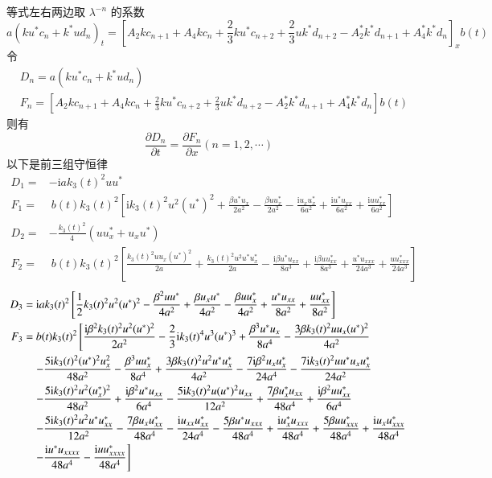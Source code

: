 等式左右两边取 $\lambda^{-n}$ 的系数
\begin{equation}
  a(ku^{*}c_{n} + k^{*}ud_{n})_{t} = \left[A_{2}kc_{n+1} + A_{4}kc_{n} + \frac{2}{3}ku^{*}c_{n+2} + \frac{2}{3}uk^{*}d_{n+2} - A_{2}^{*}k^{*}d_{n+1} + A_{4}^{*}k^{*}d_{n}\right]_{x}b(t)
\end{equation}
令
\begin{align}
  & D_{n} = a(ku^{*}c_{n} + k^{*}ud_{n}) \\
  & F_{n} = \left[A_{2}kc_{n+1} + A_{4}kc_{n} + \frac{2}{3}ku^{*}c_{n+2} + \frac{2}{3}uk^{*}d_{n+2} - A_{2}^{*}k^{*}d_{n+1} + A_{4}^{*}k^{*}d_{n}\right]b(t)
\end{align}
则有
\begin{equation}
  \frac{\partial D_{n}}{\partial t} = \frac{\partial F_{n}}{\partial x} (n = 1, 2, \cdots)
\end{equation}
以下是前三组守恒律
\begin{align}
  D_{1} =& -\mathrm{i}ak_3(t)^{2} uu^{*} \\
  F_{1} =&\ b(t)k_3(t)^{2} \left[\mathrm{i}k_3(t)^{2}u^2(u^*)^2 + \frac{\beta u^{*}u_{x}}{2a^{2}} - \frac{\beta uu^{*}_{x}}{2a^{2}} - \frac{\mathrm{i}u_{x}u^{*}_{x}}{6a^{2}} + \frac{\mathrm{i}u^{*}u_{xx}}{6a^{2}} + \frac{\mathrm{i}uu^{*}_{xx}}{6a^{2}} \right] \\
  D_{2} =& -\frac{k_{3}(t)^{2}}{4}(uu^{*}_{x} + u_{x}u^{*}) \\
  F_{2} =&\ b(t)k_3(t)^{2} \left[\frac{k_3(t)^{2}uu_x(u^*)^2}{2a} + \frac{k_3(t)^2u^2u^*u^*_x}{2a} -\frac{\mathrm{i}\beta u^*u_{xx}}{8a^3} + \frac{\mathrm{i}\beta uu^*_{xx}}{8a^3} + \frac{u^*u_{xxx}}{24a^3} + \frac{uu^*_{xxx}}{24a^3}  \right]
\end{align}
\begin{align}
  D_{3} =&\ \mathrm{i}ak_3(t)^2\left[\frac{1}{2}k_3(t)^2u^2(u^*)^2 - \frac{\beta^2 uu^*}{4a^2} + \frac{\beta u_xu^*}{4a^2} - \frac{\beta uu^*_x}{4a^2} + \frac{u^*u_{xx}}{8a^2} + \frac{uu^*_{xx}}{8a^2}\right] \\
  F_{3} =&\ b(t)k_3(t)^{2} \left[ \frac{\mathrm{i}\beta^2k_3(t)^2u^2(u^*)^2}{2a^2} - \frac{2}{3}\mathrm{i}k_3(t)^4u^3(u^*)^3 + \frac{\beta^3 u^*u_x}{8a^4} - \frac{3\beta k_3(t)^2uu_x(u^*)^2}{4a^2} \right. \notag \\
  & \left.- \frac{5\mathrm{i}k_3(t)^2(u^*)^2u_x^2}{48a^2} - \frac{\beta^3uu^*_x}{8a^4} + \frac{3\beta k_3(t)^2u^2u^*u^*_x}{4a^2} - \frac{7\mathrm{i}\beta^2u_xu^*_x}{24a^4} - \frac{7\mathrm{i}k_3(t)^2uu^*u_xu^*_x}{24a^2} \right. \notag\\
  & \left. -\frac{5\mathrm{i}k_3(t)^2u^2(u^*_x)^2}{48a^2} + \frac{\mathrm{i}\beta^2u^*u_{xx}}{6a^4} - \frac{5\mathrm{i}k_3(t)^2u(u^*)^2u_{xx}}{12a^2} + \frac{7\beta u^*_xu_{xx}}{48a^4} + \frac{\mathrm{i}\beta^2uu^*_{xx}}{6a^4} \right. \notag\\
  & \left.  - \frac{5\mathrm{i}k_3(t)^2u^2u^*u^*_{xx}}{12a^2} -\frac{7\beta u_xu^*_{xx}}{48a^4} - \frac{\mathrm{i}u_{xx}u^*_{xx}}{24a^4} - \frac{5\beta u^*u_{xxx}}{48a^4} + \frac{\mathrm{i}u^*_xu_{xxx}}{48a^4} + \frac{5\beta uu^*_{xxx}}{48a^4} + \frac{\mathrm{i}u_xu^*_{xxx}}{48a^4}  \right. \notag\\
  & \left. - \frac{\mathrm{i}u^*u_{xxxx}}{48a^4} - \frac{\mathrm{i}uu^*_{xxxx}}{48a^4} \right]
\end{align}
